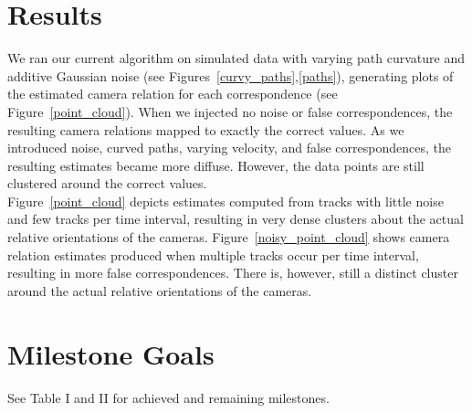 \documentclass[journal]{IEEEtran}
\begin{document}
\section{Results}
	\indent We ran our current algorithm on simulated data with varying path curvature and additive Gaussian noise (see Figures~\ref{curvy_paths},\ref{paths}), generating plots of the estimated camera relation for each correspondence (see Figure~\ref{point_cloud}). When we injected no noise or false correspondences, the resulting camera relations mapped to exactly the correct values. As we introduced noise, curved paths, varying velocity, and false correspondences, the resulting estimates became more diffuse. However, the data points are still clustered around the correct values. \\
	\indent Figure~\ref{point_cloud} depicts estimates computed from tracks with little noise and few tracks per time interval, resulting in very dense clusters about the actual relative orientations of the cameras. Figure~\ref{noisy_point_cloud} shows camera relation estimates produced when multiple tracks occur per time interval, resulting in more false correspondences. There is, however, still a distinct cluster around the actual relative orientations of the cameras.





\section{Milestone Goals}
	See Table I and II for achieved and remaining milestones.

	




%
\end{document}
